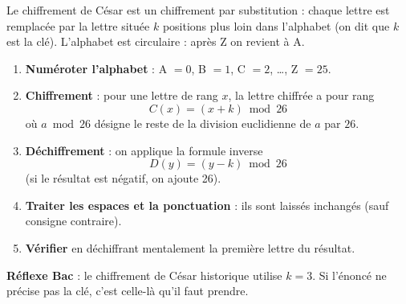 \documentclass[11pt]{article}
\newcommand{\cle}[1]{{\popxbold\color{popdark}#1}}
\begin{document}
\begin{methode}
Le chiffrement de César est un chiffrement par \cle{substitution} : chaque lettre est remplacée par la lettre située $k$ positions plus loin dans l'alphabet (on dit que $k$ est la \cle{clé}). L'alphabet est circulaire : après Z on revient à A.
\begin{enumerate}
  \item \textbf{Numéroter l'alphabet} : A $= 0$, B $= 1$, C $= 2$, \dots, Z $= 25$.
  \item \textbf{Chiffrement} : pour une lettre de rang $x$, la lettre chiffrée a pour rang
  \[ C(x) = (x + k) \bmod 26 \]
  où $a \bmod 26$ désigne le reste de la division euclidienne de $a$ par $26$.
  \item \textbf{Déchiffrement} : on applique la formule inverse
  \[ D(y) = (y - k) \bmod 26 \]
  (si le résultat est négatif, on ajoute 26).
  \item \textbf{Traiter les espaces et la ponctuation} : ils sont laissés inchangés (sauf consigne contraire).
  \item \textbf{Vérifier} en déchiffrant mentalement la première lettre du résultat.
\end{enumerate}
\textbf{Réflexe Bac} : le chiffrement de César historique utilise $k = 3$. Si l'énoncé ne précise pas la clé, c'est celle-là qu'il faut prendre.
\end{methode}
\end{document}
